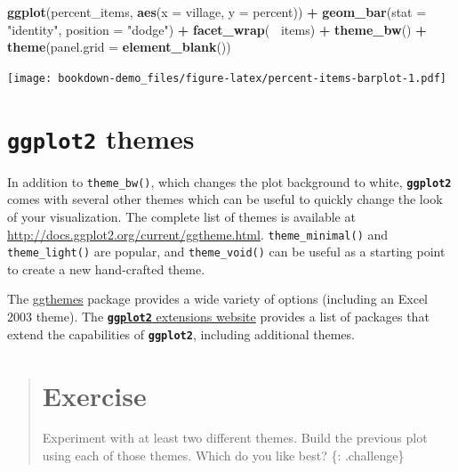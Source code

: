 \documentclass[]{book}
\newenvironment{Shaded}{\begin{snugshade}}{\end{snugshade}}
\newcommand{\KeywordTok}[1]{\textcolor[rgb]{0.13,0.29,0.53}{\textbf{#1}}}
\newcommand{\DataTypeTok}[1]{\textcolor[rgb]{0.13,0.29,0.53}{#1}}
\newcommand{\StringTok}[1]{\textcolor[rgb]{0.31,0.60,0.02}{#1}}
\newcommand{\OperatorTok}[1]{\textcolor[rgb]{0.81,0.36,0.00}{\textbf{#1}}}
\newcommand{\NormalTok}[1]{#1}
\begin{document}
\begin{Shaded}
\begin{Highlighting}[]
\KeywordTok{ggplot}\NormalTok{(percent_items, }\KeywordTok{aes}\NormalTok{(}\DataTypeTok{x =}\NormalTok{ village, }\DataTypeTok{y =}\NormalTok{ percent)) }\OperatorTok{+}
\StringTok{    }\KeywordTok{geom_bar}\NormalTok{(}\DataTypeTok{stat =} \StringTok{"identity"}\NormalTok{, }\DataTypeTok{position =} \StringTok{"dodge"}\NormalTok{) }\OperatorTok{+}
\StringTok{    }\KeywordTok{facet_wrap}\NormalTok{(}\OperatorTok{~}\StringTok{ }\NormalTok{items) }\OperatorTok{+}
\StringTok{    }\KeywordTok{theme_bw}\NormalTok{() }\OperatorTok{+}
\StringTok{    }\KeywordTok{theme}\NormalTok{(}\DataTypeTok{panel.grid =} \KeywordTok{element_blank}\NormalTok{())}
\end{Highlighting}
\end{Shaded}

\texttt{[image: bookdown-demo\_files/figure-latex/percent-items-barplot-1.pdf]}

\section{\texorpdfstring{\textbf{\texttt{ggplot2}}
themes}{ggplot2 themes}}\label{ggplot2-themes}

In addition to \texttt{theme\_bw()}, which changes the plot background
to white, \textbf{\texttt{ggplot2}} comes with several other themes
which can be useful to quickly change the look of your visualization.
The complete list of themes is available at
\url{http://docs.ggplot2.org/current/ggtheme.html}.
\texttt{theme\_minimal()} and \texttt{theme\_light()} are popular, and
\texttt{theme\_void()} can be useful as a starting point to create a new
hand-crafted theme.

The
\href{https://jrnold.github.io/ggthemes/reference/index.html}{ggthemes}
package provides a wide variety of options (including an Excel 2003
theme). The
\href{https://www.ggplot2-exts.org}{\textbf{\texttt{ggplot2}} extensions
website} provides a list of packages that extend the capabilities of
\textbf{\texttt{ggplot2}}, including additional themes.

\begin{quote}
\section{Exercise}\label{exercise-15}

Experiment with at least two different themes. Build the previous plot
using each of those themes. Which do you like best? \{: .challenge\}
\end{quote}
\end{document}
